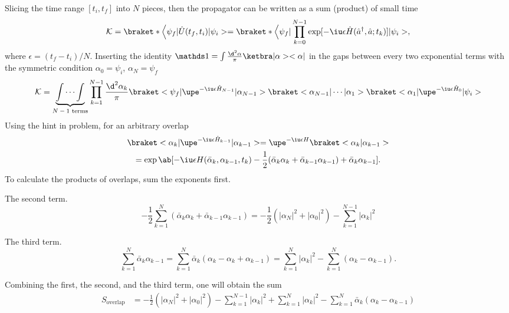 \begin{solution}\leavevmode
  \begin{enumext}
    \item Slicing the time range $[t_i, t_f]$ into $N$ pieces, then
    the propagator can be written as a sum (product) of small time
    \[
      \mathcal K = \braket*\Big<\psi_f|\hat U(t_f, t_i)|\psi_i>
    = \braket*\Big<\psi_f|\prod_{k=0}^{N-1}
        \exp[-\iu \epsilon \hat H(\hat a^\dagger, \hat a; t_k)]|\psi_i>,
    \]
    where $\epsilon = (t_f - t_i)/N$. Inserting the identity $\identity
    = \int \frac{\d^2\alpha}{\pi} \ketbra|\alpha><\alpha|$ in the gaps between
    every two exponential terms with the symmetric
    condition $\alpha_0 = \psi_i$, $\alpha_N = \psi_f$
    \[
      \mathcal K =
      \underbrace{\int \cdots \int}_\text{$N - 1$ terms}
      \prod_{k=1}^{N-1} \frac{\d^2\alpha_k}{\pi}
      \braket<\psi_f|\upe^{-\iu\epsilon\hat H_{N-1}}|\alpha_{N-1}>
      \braket<\alpha_{N-1}| \cdots |\alpha_1>
      \braket<\alpha_1|\upe^{-\iu\epsilon\hat H_0}|\psi_i>
    \]
    Using the hint in problem, for an arbitrary overlap
    \begin{multline*}
      \braket<\alpha_k|\upe^{-\iu\epsilon\hat H_{k-1}}|\alpha_{k-1}>
    = \upe^{-\iu\epsilon H} \braket<\alpha_k|\alpha_{k-1}>\\
    = \exp\ab[-\iu\epsilon H(\bar\alpha_k, \alpha_{k-1}, t_k)
      -\frac12(\bar\alpha_k \alpha_k + \bar\alpha_{k-1} \alpha_{k-1})
      +\bar\alpha_k \alpha_{k-1}].
    \end{multline*}
    To calculate the products of overlaps, sum the exponents first.
    \begin{enumext}
      \item The second term.
      \[
        -\frac12\sum_{k=1}^N (\bar\alpha_k \alpha_k
          + \bar\alpha_{k-1}\alpha_{k-1})
      = -\frac12(|\alpha_N|^2 + |\alpha_0|^2)
      - \sum_{k=1}^{N-1} |\alpha_k|^2
      \]
      \item The third term.
      \[
        \sum_{k=1}^N \bar\alpha_k \alpha_{k-1}
      = \sum_{k=1}^N \bar\alpha_k (\alpha_k - \alpha_k + \alpha_{k-1})
      = \sum_{k=1}^N |\alpha_k|^2 - \sum_{k=1}^N (\alpha_k - \alpha_{k-1}).
      \]
    \end{enumext}
    Combining the first, the second, and the third term, one will obtain the sum
    \begin{align*}
      S_\text{overlap} & = -\frac12(|\alpha_N|^2 + |\alpha_0|^2)
        - \sum_{k=1}^{N-1} |\alpha_k|^2 + \sum_{k=1}^N |\alpha_k|^2
        - \sum_{k=1}^N \bar\alpha_k (\alpha_k - \alpha_{k-1})

\end{align*}
\end{enumext}
\end{solution}
